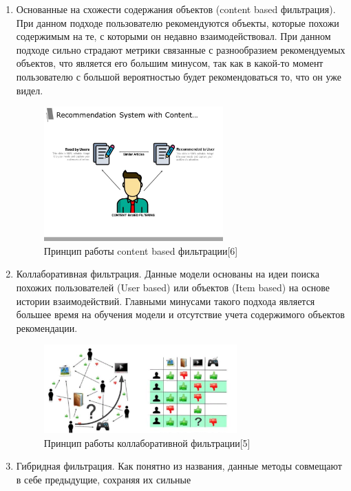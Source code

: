 \documentclass[bachelor, och, coursework]{SCWorks}
\begin{document}
\begin{enumerate}
    \item Основанные на схожести содержания объектов (content based фильтрация). При данном подходе пользователю рекомендуются
    объекты, которые похожи содержимым на те, с которыми он недавно взаимодействовал. При данном подходе сильно страдают
    метрики связанные с разнообразием рекомендуемых объектов, что является его большим минусом, так как в какой-то
    момент пользователю с большой вероятностью будет рекомендоваться то, что он уже видел.
    \begin{figure}[H]
        \centering
        \includegraphics[width=0.65\textwidth]{pic/2}
        \caption{Принцип работы content based фильтрации[6]}
        \label{fig:img1}
    \end{figure}
    \item Коллаборативная фильтрация. Данные модели основаны на идеи поиска похожих пользователей (User based) или объектов (Item based)
    на основе истории взаимодействий. Главными минусами такого подхода является большее время на обучения модели и отсутствие учета содержимого объектов рекомендации.
    \begin{figure}[H]
        \centering
        \includegraphics[width=0.7\textwidth]{pic/1}
        \caption{Принцип работы коллаборативной фильтрации[5]}
        \label{fig:img1}
    \end{figure}
    \item Гибридная фильтрация. Как понятно из названия, данные методы совмещают в себе предыдущие, сохраняя их сильные

\end{enumerate}
\end{document}

